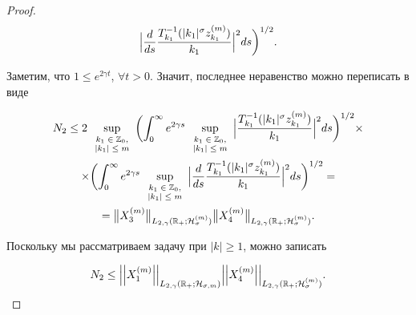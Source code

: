 \begin{proof}
\begin{multline*}
\Bigl|

\frac{d}{ds}\frac{T^{-1}_{k_1}(|k_1|^\sigma z_{k_1}^{(m)})}{k_1} 

\Bigr|^2ds

\biggr)^{1/2}.

\end{multline*}

Заметим, что $1\le e^{2\gamma t}$, $\forall t>0$. Значит, последнее неравенство можно переписать в виде

\begin{multline*}

 N_2\le 2\sup_{\scriptsize \begin{array}{c} k_1\in \mathbb Z_0, \\ |k_1|\le m \end{array}}  

 \biggl( \int_0^\infty e^{2\gamma s}\sup_{\scriptsize \begin{array}{c} k_1\in \mathbb Z_0, \\ |k_1|\le m \end{array}}

 \Bigl|\frac{T^{-1}_{k_1}(|k_1|^\sigma z_{k_1}^{(m)})}{k_1} \Bigr|^2ds\biggr)^{1/2}\times

\\

\times \biggl(\int_0^\infty e^{2\gamma s} \sup_{\scriptsize \begin{array}{c} k_1\in \mathbb Z_0, \\ |k_1|\le m \end{array}}\Bigl|\frac{d}{ds}\frac{T^{-1}_{k_1}(|k_1|^\sigma z_{k_1}^{(m)})}{k_1} \Bigr|^2ds\biggr)^{1/2}=

\\

=

\bigl\|X_3^{(m)}\bigr\|_{L_{2,\gamma}(\mathbb R_{+};{\cal H}^{(m)}_{\sigma})}

\bigl\|X_4^{(m)}\bigr\|_{L_{2,\gamma}(\mathbb R_{+};{\cal H}^{(m)}_{\sigma})}.

\end{multline*}

Поскольку мы рассматриваем задачу при $|k|\ge 1$, можно записать

$$

N_2\le \Big|\Big|X_1^{(m)}\Big|\Big|_{L_{2,\gamma}(\mathbb R_{+};{\cal H}_{\sigma,m})}\Big|\Big|X_4^{(m)}\Big|\Big|_{L_{2,\gamma}(\mathbb R_{+};{\cal H}^{(m)}_{\sigma})}.

$$


\end{proof}
